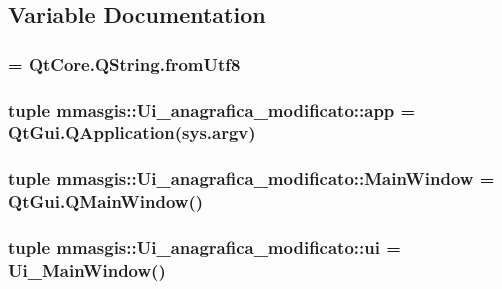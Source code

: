 \subsection{Variable Documentation}
\hypertarget{namespacemmasgis_1_1Ui__anagrafica__modificato_ae9668e3865bcfb3029dd4a23c99563f2}{
\subsubsection[{\_\-fromUtf8}]{ = QtCore.QString.fromUtf8}}
\label{namespacemmasgis_1_1Ui__anagrafica__modificato_ae9668e3865bcfb3029dd4a23c99563f2}
\hypertarget{namespacemmasgis_1_1Ui__anagrafica__modificato_ac84fd3431693fef91a33e9994788e27a}{
\subsubsection[{app}]{\setlength{\rightskip}{0pt plus 5cm}tuple {\bf mmasgis::Ui\_\-anagrafica\_\-modificato::app} = QtGui.QApplication(sys.argv)}}
\label{namespacemmasgis_1_1Ui__anagrafica__modificato_ac84fd3431693fef91a33e9994788e27a}
\hypertarget{namespacemmasgis_1_1Ui__anagrafica__modificato_ab6c175c64e281f61dac1694097c9073c}{
\subsubsection[{MainWindow}]{\setlength{\rightskip}{0pt plus 5cm}tuple {\bf mmasgis::Ui\_\-anagrafica\_\-modificato::MainWindow} = QtGui.QMainWindow()}}
\label{namespacemmasgis_1_1Ui__anagrafica__modificato_ab6c175c64e281f61dac1694097c9073c}
\hypertarget{namespacemmasgis_1_1Ui__anagrafica__modificato_ada6b63e4dd4d05cb754094e327e27e77}{
\subsubsection[{ui}]{\setlength{\rightskip}{0pt plus 5cm}tuple {\bf mmasgis::Ui\_\-anagrafica\_\-modificato::ui} = {\bf Ui\_\-MainWindow}()}}
\label{namespacemmasgis_1_1Ui__anagrafica__modificato_ada6b63e4dd4d05cb754094e327e27e77}
